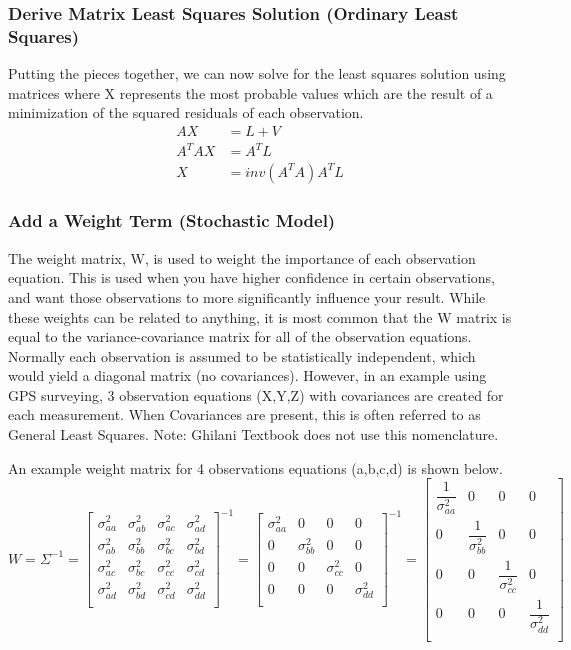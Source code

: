 \subsubsection*{Derive Matrix Least Squares Solution (Ordinary Least Squares)}
Putting the pieces together, we can now solve for the least squares solution using matrices where X represents the most probable values which are the result of a minimization of the squared residuals of each observation.
\begin{align*}
AX &= L + V \\
A^TAX &= A^TL \\
X &= inv(A^TA)A^TL
\end{align*}
\subsubsection*{Add a Weight Term (Stochastic Model)}
The weight matrix, W, is used to weight the importance of each observation equation.  This is used when you have higher confidence in certain observations, and want those observations to more significantly influence your result.  While these weights can be related to anything, it is most common that the W matrix is equal to the variance-covariance matrix for all of the observation equations.  Normally each observation is assumed to be statistically independent, which would yield a diagonal matrix (no covariances).  However, in an example using GPS surveying, 3 observation equations (X,Y,Z) with covariances are created for each measurement.  When Covariances are present, this is often referred to as General Least Squares.  Note: Ghilani Textbook does not use this nomenclature.

An example weight matrix for 4 observations equations (a,b,c,d) is shown below.
\[
W = \Sigma^{-1} = 
\begin{bmatrix}
\sigma_{aa}^2 & \sigma_{ab}^2 & \sigma_{ac}^2 & \sigma_{ad}^2 \\ 
\sigma_{ab}^2 & \sigma_{bb}^2 & \sigma_{bc}^2 & \sigma_{bd}^2 \\ 
\sigma_{ac}^2 & \sigma_{bc}^2 & \sigma_{cc}^2 & \sigma_{cd}^2 \\ 
\sigma_{ad}^2 & \sigma_{bd}^2 & \sigma_{cd}^2 & \sigma_{dd}^2 \\ 
\end{bmatrix}
^{-1}
= 
\begin{bmatrix}
\sigma_{aa}^2 & 0 & 0 & 0 \\ 
0 & \sigma_{bb}^2 & 0 & 0 \\
0 & 0 & \sigma_{cc}^2 & 0 \\
0 & 0 & 0 & \sigma_{dd}^2 \\
\end{bmatrix}
^{-1}
=
\begin{bmatrix}
\dfrac{1}{\sigma_{aa}^2} & 0 & 0 & 0 \\ 
0 & \dfrac{1}{\sigma_{bb}^2} & 0 & 0 \\
0 & 0 & \dfrac{1}{\sigma_{cc}^2} & 0 \\
0 & 0 & 0 & \dfrac{1}{\sigma_{dd}^2} \\
\end{bmatrix}
\]

